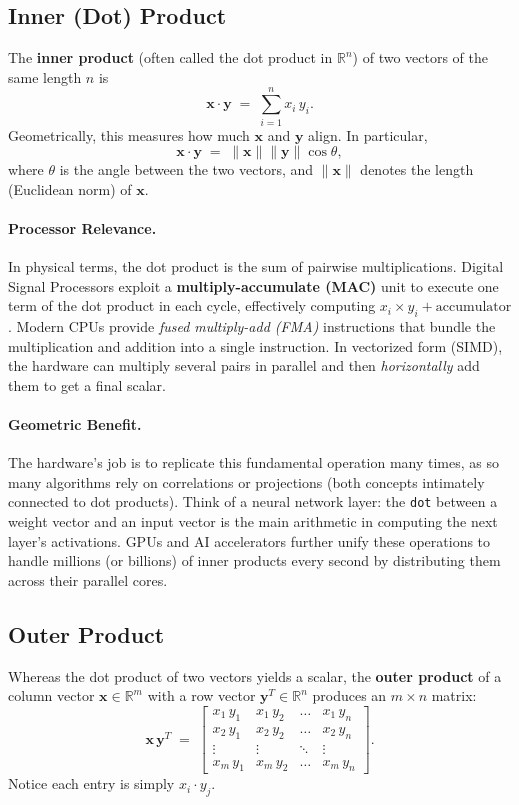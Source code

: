 \subsection{Inner (Dot) Product}
The \textbf{inner product} (often called the dot product in $\mathbb{R}^n$) of two vectors of the same length $n$ is
\[
\mathbf{x} \cdot \mathbf{y} \;=\; \sum_{i=1}^{n} x_i \, y_i.
\]
Geometrically, this measures how much $\mathbf{x}$ and $\mathbf{y}$ align. In particular,
\[
\mathbf{x} \cdot \mathbf{y} \;=\; \|\mathbf{x}\|\|\mathbf{y}\|\cos\theta,
\]
where $\theta$ is the angle between the two vectors, and $\|\mathbf{x}\|$ denotes the length (Euclidean norm) of $\mathbf{x}$.

\paragraph{Processor Relevance.} 
In physical terms, the dot product is the sum of pairwise multiplications. Digital Signal Processors exploit a \textbf{multiply-accumulate (MAC)} unit to execute one term of the dot product in each cycle, effectively computing $x_i \times y_i + \text{accumulator}$. Modern CPUs provide \emph{fused multiply-add (FMA)} instructions that bundle the multiplication and addition into a single instruction. In vectorized form (SIMD), the hardware can multiply several pairs in parallel and then \emph{horizontally} add them to get a final scalar. 

\paragraph{Geometric Benefit.} 
The hardware’s job is to replicate this fundamental operation many times, as so many algorithms rely on correlations or projections (both concepts intimately connected to dot products). Think of a neural network layer: the \texttt{dot} between a weight vector and an input vector is the main arithmetic in computing the next layer’s activations. GPUs and AI accelerators further unify these operations to handle millions (or billions) of inner products every second by distributing them across their parallel cores.

\subsection{Outer Product}
Whereas the dot product of two vectors yields a scalar, the \textbf{outer product} of a column vector $\mathbf{x}\in \mathbb{R}^m$ with a row vector $\mathbf{y}^T\in \mathbb{R}^n$ produces an $m\times n$ matrix:
\[
\mathbf{x}\,\mathbf{y}^T 
\;=\; \begin{bmatrix}
x_1\,y_1 & x_1\,y_2 & \ldots & x_1\,y_n \\[6pt]
x_2\,y_1 & x_2\,y_2 & \ldots & x_2\,y_n \\[3pt]
\vdots   & \vdots   & \ddots & \vdots   \\[3pt]
x_m\,y_1 & x_m\,y_2 & \ldots & x_m\,y_n
\end{bmatrix}.
\]
Notice each entry is simply $x_i \cdot y_j$.

